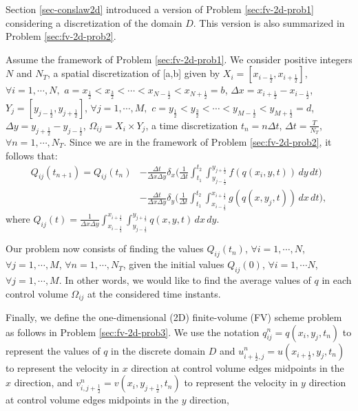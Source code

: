 Section \ref{sec-conslaw2d} introduced a version of Problem \ref{sec:fv-2d-prob1}
considering a discretization of the domain $D$. 
This version is also summarized in Problem \ref{sec:fv-2d-prob2}.
\begin{prob}
	\label{sec:fv-2d-prob2}
	Assume the framework of Problem \ref{sec:fv-2d-prob1}.
	We consider positive integers $N$ and $N_T$, a spatial discretization of [a,b] given by
	$X_i = [x_{i-\frac{1}{2}}, x_{i+\frac{1}{2}}]$,
	$\forall i = 1, \cdots, N,$ 
	$a = x_{\frac{1}{2}} < x_{\frac{3}{2}} < \cdots < x_{N-\frac{1}{2}} < x_{N+\frac{1}{2}} = b$,
	$\Delta x = x_{i+\frac{1}{2}}-x_{i-\frac{1}{2}}$, $Y_j = [y_{j-\frac{1}{2}}, y_{j+\frac{1}{2}}]$,
	$\forall j = 1, \cdots, M,$ 
	$c = y_{\frac{1}{2}} < y_{\frac{3}{2}} < \cdots < y_{M-\frac{1}{2}} < y_{M+\frac{1}{2}} = d$,
	$\Delta y = y_{j+\frac{1}{2}}-y_{j-\frac{1}{2}}$,
	$\Omega_{ij} = X_i \times Y_j$,
	a time discretization
	$t_n = n\Delta t$, $\Delta t = \frac{T}{N_T}$, $\forall n = 1, \cdots, N_T$.
	Since we are in the framework of Problem \ref{sec:fv-2d-prob2}, it follows that:
	\begin{align*}
		{Q}_{ij}(t_{n+1})  = {Q}_{ij}(t_{n})
		&- \frac{\Delta t}{\Delta x \Delta y}
		\delta _x \bigg( \frac{1}{\Delta t}
		\int_{t_1}^{t_2} \int_{y_{j-\frac{1}{2}}}^{y_{j+\frac{1}{2}}} 
		{f}({q}(x_{i}, y, t))
		\,dy \,dt \bigg) \\ \nonumber
		&- \frac{\Delta t}{\Delta x \Delta y}
		\delta _y \bigg( \frac{1}{\Delta t}
		\int_{t_1}^{t_2} \int_{x_{i-\frac{1}{2}}}^{x_{i+\frac{1}{2}}} 
		{g}({q}(x, y_{j}, t))
		\,dx \,dt \bigg),
	\end{align*}
	where ${Q}_{ij}(t) = \frac{1}{\Delta x \Delta y}
	\int_{x_{i-\frac{1}{2}}}^{x_{i+\frac{1}{2}}} 
	\int_{y_{j-\frac{1}{2}}}^{y_{j+\frac{1}{2}}} {q}(x,y,t) \,dx \,dy$.
	
	Our problem now consists of finding the values ${Q}_{ij}(t_{n})$, 
	$\forall i = 1, \cdots, N$, $\forall j = 1, \cdots, M$, $\forall n = 1, \cdots, N_T$,
    given the initial values ${Q}_{ij}(0)$, $\forall i = 1, \cdots N$, $\forall j = 1, \cdots, M$.
	In other words, we would like to find the average values of ${q}$
	in each control volume $\Omega_{ij}$ at the considered time instants.
\end{prob}

Finally, we define the one-dimensional (2D) finite-volume (FV)
scheme problem as follows in Problem \ref{sec:fv-2d-prob3}.
We use the notation ${q}^n_{ij} = {q}(x_i, y_j, t_n)$
to represent the values of ${q}$ in the discrete domain $D$
and $u_{i+\frac{1}{2},j}^n = u(x_{i+\frac{1}{2}}, y_j, t_n)$
to represent the velocity in $x$ direction at control volume
edges midpoints in the $x$ direction, 
and $v_{i,j+\frac{1}{2}}^n = v(x_i,y_{j+\frac{1}{2}},t_n)$
to represent the velocity in $y$ direction at control volume
edges midpoints in the $y$ direction, 

